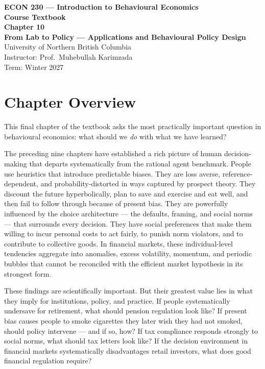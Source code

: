\documentclass[12pt, letterpaper]{article}
\begin{document}
\begin{titlepage}
\centering\vspace*{3cm}
{\Large\bfseries\color{econblue} ECON 230 --- Introduction to Behavioural Economics\\[1em]}
{\large\bfseries Course Textbook\\[2em]}
{\LARGE\bfseries\color{econblue} Chapter 10\\[0.5em]}
{\Large\bfseries From Lab to Policy --- Applications and Behavioural Policy Design\\[2em]}
\vfill
{\normalsize University of Northern British Columbia\\
Instructor: Prof.\ Muhebullah Karimzada\\
Term: Winter 2027}
\end{titlepage}
\tableofcontents
\newpage




\section*{Chapter Overview}


This final chapter of the textbook asks the most practically important question in behavioural economics: what should we \textit{do} with what we have learned?

The preceding nine chapters have established a rich picture of human decision-making that departs systematically from the rational agent benchmark. People use heuristics that introduce predictable biases. They are loss averse, reference-dependent, and probability-distorted in ways captured by prospect theory. They discount the future hyperbolically, plan to save and exercise and eat well, and then fail to follow through because of present bias. They are powerfully influenced by the choice architecture --- the defaults, framing, and social norms --- that surrounds every decision. They have social preferences that make them willing to incur personal costs to act fairly, to punish norm violators, and to contribute to collective goods. In financial markets, these individual-level tendencies aggregate into anomalies, excess volatility, momentum, and periodic bubbles that cannot be reconciled with the efficient market hypothesis in its strongest form.

These findings are scientifically important. But their greatest value lies in what they imply for institutions, policy, and practice. If people systematically undersave for retirement, what should pension regulation look like? If present bias causes people to smoke cigarettes they later wish they had not smoked, should policy intervene --- and if so, how? If tax compliance responds strongly to social norms, what should tax letters look like? If the decision environment in financial markets systematically disadvantages retail investors, what does good financial regulation require?
\end{document}
